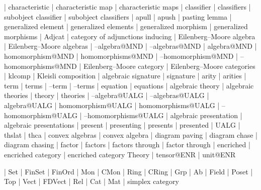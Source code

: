     |   characteristic
    |   characteristic map
    |   characteristic maps
    |   classifier
    |   classifiers
    |   subobject classifier
    |   subobject classifiers
    |   apull
    |   apush
    |   pasting lemma
    |   generalized element
    |   generalized elements
    |   generalized morphism
    |   generalized morphisms
    |   Adjcat
    |   category of adjunctions inducing
    |   Eilenberg--Moore algebra
    |   Eilenberg--Moore algebras
    |   --algebra@MND
    |   --algebras@MND
    |   algebra@MND
    |   homomorphism@MND
    |   homomorphisms@MND
    |   --homomorphism@MND
    |   --homomorphisms@MND
    |   Eilenberg--Moore category
    |   Eilenberg--Moore categories
    |   klcomp
    |   Kleisli composition
    |   algebraic signature
    |   signature
    |   arity
    |   arities
    |   term
    |   terms
    |   --term
    |   --terms
    |   equation
    |   equations
    |   algebraic theory
    |   algebraic theories
    |   theory
    |   theories
    |   --algebra@UALG
    |   --algebras@UALG
    |   algebra@UALG
    |   homomorphism@UALG
    |   homomorphisms@UALG
    |   --homomorphism@UALG
    |   --homomorphisms@UALG
    |   algebraic presentation
    |   algebraic presentations
    |   present
    |   presenting
    |   presents
    |   presented
    |   UALG
    |   thslat
    |   thca
    |   convex algebras
    |   convex algebra
    |   diagram paving
    |   diagram chase
    |   diagram chasing
    |   factor
    |   factors
    |   factors through
    |   factor through
    |   encriched
    |   encriched category
    |   encriched category Theory
    |   tensor@ENR
    |   unit@ENR

    |   Set
    |   FinSet
    |   FinOrd
    |   Mon
    |   CMon
    |   Ring
    |   CRing
    |   Grp
    |   Ab
    |   Field
    |   Poset
    |   Top
    |   Vect
    |   FDVect
    |   Rel
    |   Cat
    |   Mat
    |   simplex category
